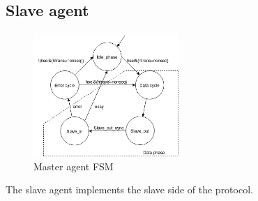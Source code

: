 \subsection{Slave agent}
\begin{figure}
\includegraphics[width=5.5cm]{figs/hw/sAgent_FSM.png}
\caption{Master agent FSM}\label{fig:rsfsm}
\end{figure}  

The slave agent implements the slave side of the protocol. 

